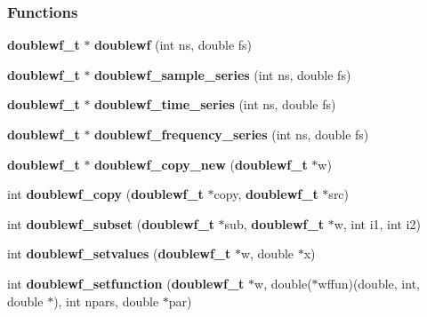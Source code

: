 \subsubsection*{Functions}
\begin{CompactItemize}
\item 
{\bf doublewf\_\-t} $\ast$ {\bf doublewf} (int ns, double fs)
\item 
{\bf doublewf\_\-t} $\ast$ {\bf doublewf\_\-sample\_\-series} (int ns, double fs)
\item 
{\bf doublewf\_\-t} $\ast$ {\bf doublewf\_\-time\_\-series} (int ns, double fs)
\item 
{\bf doublewf\_\-t} $\ast$ {\bf doublewf\_\-frequency\_\-series} (int ns, double fs)
\item 
{\bf doublewf\_\-t} $\ast$ {\bf doublewf\_\-copy\_\-new} ({\bf doublewf\_\-t} $\ast$w)
\item 
int {\bf doublewf\_\-copy} ({\bf doublewf\_\-t} $\ast$copy, {\bf doublewf\_\-t} $\ast$src)
\item 
int {\bf doublewf\_\-subset} ({\bf doublewf\_\-t} $\ast$sub, {\bf doublewf\_\-t} $\ast$w, int i1, int i2)
\item 
int {\bf doublewf\_\-setvalues} ({\bf doublewf\_\-t} $\ast$w, double $\ast$x)
\item 
int \textbf{doublewf\_\-setfunction} ({\bf doublewf\_\-t} $\ast$w, double($\ast$wffun)(double, int, double $\ast$), int npars, double $\ast$par)\label{doublewf_8c_381fa1103084cd430eb291c372abad1e}


\end{CompactItemize}
